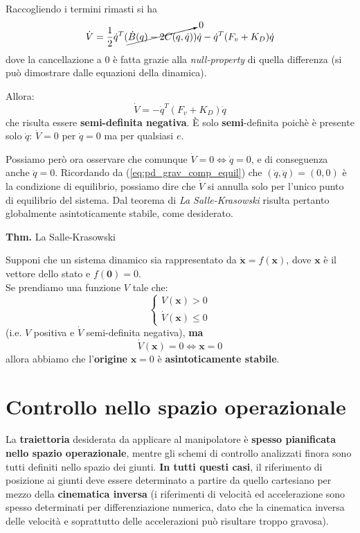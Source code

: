 Raccogliendo i termini rimasti si ha
$$
\dot{V} = \frac{1}{2} \dot{q}^T ( \cancelto{0}{ \dot{B}(q) - 2C(q, \dot{q}) })\dot{q} - \dot{q}^T (F_v + K_D)\dot{q}
$$
dove la cancellazione a 0 è fatta grazie alla \textit{null-property} di quella differenza (si può dimostrare dalle equazioni della dinamica).

Allora:
$$
\dot{V} = - \dot{q}^T (F_v + K_D)\dot{q}
$$
che risulta essere \textbf{semi-definita negativa}. È solo \textbf{semi}-definita poichè è presente solo $\dot{q}$: $\dot{V} = 0$ per $\dot{q} = 0$ ma per qualsiasi $e$.

Possiamo però ora osservare che comunque $\dot{V} = 0 \iff \dot{q} = 0$, e di conseguenza anche $\ddot{q} = 0$. Ricordando da (\ref{eq:pd_grav_comp_equil}) che $(\dot{q}, \ddot{q}) = (0,0)$ è la condizione di equilibrio, possiamo dire che $\dot{V}$ si annulla solo per l'unico punto di equilibrio del sistema.
Dal teorema di \textit{La Salle-Krasowski} risulta pertanto globalmente asintoticamente stabile, come desiderato.
\unboldmath

\vspace*{15pt}
\begin{addendum}
\textbf{Thm.} La Salle-Krasowski

Supponi che un sistema dinamico sia rappresentato da $\dot{\mathbf{x}}=f(\mathbf{x})$, dove $\mathbf{x}$ è il vettore dello stato e $f(\mathbf{0})=0$.\\
Se prendiamo una funzione $V$ tale che:
$$
\begin{cases}
	V(\mathbf{x}) > 0 \\
	\dot{V}(\mathbf{x}) \leq 0
\end{cases}
$$
(i.e. $V$ positiva e $\dot{V}$ semi-definita negativa), \textbf{ma}
$$
\dot{V}(\mathbf{x}) = 0 \iff \mathbf{x} = 0
$$
allora abbiamo che l'\textbf{origine} $\mathbf{x} = 0$ è \textbf{asintoticamente stabile}.
\end{addendum}










\section{Controllo nello spazio operazionale}
La \textbf{traiettoria} desiderata da applicare al manipolatore è \textbf{spesso pianificata nello spazio operazionale}, mentre gli schemi di controllo analizzati finora sono tutti definiti nello spazio dei giunti.
\textbf{In tutti questi casi}, il riferimento di posizione ai giunti deve essere determinato a partire da quello cartesiano per mezzo della \textbf{cinematica inversa} (i riferimenti di velocità ed accelerazione sono spesso determinati per differenziazione numerica, dato che la cinematica inversa delle velocità e soprattutto delle accelerazioni può risultare troppo gravosa).

